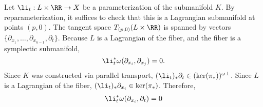 

    Let $\li_t:L\times \RR\to X$ be a parameterization of the submanifold $K$.
    By reparameterization, it suffices to check that this is a Lagrangian submanifold at points $(p, 0)$. 
    The tangent space $T_{(p, 0)}(L\times \RR)$ is spanned by vectors $\{\partial_{x_1}, \ldots, \partial_{x_{n-1}}, \partial_t\}$. 
    Because $L$ is a Lagrangian of the fiber, and the fiber is a symplectic submanifold,
    \[\li_t^*\omega(\partial_{x_i}, \partial_{x_j})=0.\]
    Since $K$ was constructed via parallel transport, $(\li_t)_*\partial_t\in (\ker(\pi_*))^{\omega\bot}$. Since $L$ is a Lagrangian of the fiber, $(\li_t)_*\partial_{x_i}\in \ker(\pi_*)$.
    Therefore, 
    \begin{align*}\li_t^*\omega(\partial_{x_i}, \partial_{t})=0
    \end{align*}

